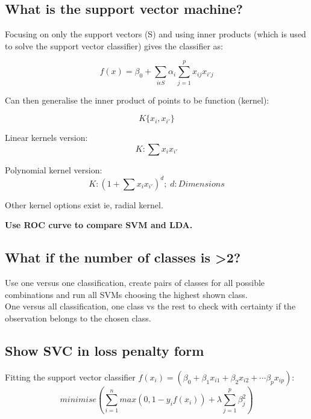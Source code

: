 \documentclass[11pt]{scrartcl} %
\begin{document}
\subsection{What is the support vector machine?}

Focusing on only the support vectors (S) and using inner products (which is used to solve the
support vector classifier) gives the classifier as:

\begin{equation}
	f(x) = \beta_0 + \sum_{i\epsilon S}{\alpha_i\sum^p_{j=1}{x_{ij}x_{i'j}}}
\end{equation}

Can then generalise the inner product of points to be function (kernel):

\begin{equation}
	K\{x_i,x_{i'}\}
\end{equation}

Linear kernels version:
\begin{equation}
	K : \sum{x_ix_{i'}}
\end{equation}

Polynomial kernel version:
\begin{equation}
	K: (1+ \sum{x_ix_{i'}})^d;\; d:Dimensions
\end{equation}

Other kernel options exist ie, radial kernel.

\textbf{Use ROC curve to compare SVM and LDA.}

\subsection{What if the number of classes is >2?}

Use one versus one classification, create pairs of classes for all possible combinations and run
all SVMs choosing the highest shown class.\\

One versus all classification, one class vs the rest to check with certainty if the observation belongs
to the chosen class.

\subsection{Show SVC in loss penalty form}

Fitting the support vector classifier \(f(x_i) = (\beta_0+\beta_1x_{i1}+\beta_2x_{i2}+\cdots \beta_px_{ip})\):
\begin{equation}
	minimise({\sum^n_{i=1}{max(0,1-y_if(x_i))+\lambda\sum^p_{j=1}{\beta^2_j}}})
\end{equation}
\end{document}
